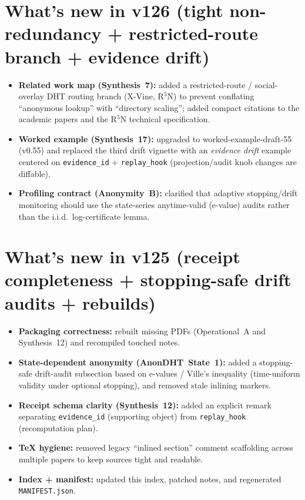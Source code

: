 \documentclass[11pt]{article}
\begin{document}
\section{What's new in v126 (tight non-redundancy + restricted-route branch + evidence drift)}
\begin{itemize}[leftmargin=*]
\item \textbf{Related work map (Synthesis~7):} added a restricted-route / social-overlay DHT routing branch (X-Vine, R$^{5}$N) to prevent conflating ``anonymous lookup'' with ``directory scaling''; added compact citations to the academic papers and the R$^{5}$N technical specification.
\item \textbf{Worked example (Synthesis~17):} upgraded to worked-example-draft-55 (v0.55) and replaced the third drift vignette with an \emph{evidence drift} example centered on \texttt{evidence\_id} + \texttt{replay\_hook} (projection/audit knob changes are diffable).
\item \textbf{Profiling contract (Anonymity~B):} clarified that adaptive stopping/drift monitoring should use the state-series anytime-valid (e-value) audits rather than the i.i.d.\ log-certificate lemma.
\end{itemize}

\section{What's new in v125 (receipt completeness + stopping-safe drift audits + rebuilds)}
\begin{itemize}[leftmargin=*]
\item \textbf{Packaging correctness:} rebuilt missing PDFs (Operational~A and Synthesis~12) and recompiled touched notes.
\item \textbf{State-dependent anonymity (AnonDHT~State~1):} added a stopping-safe drift-audit subsection based on e-values / Ville's inequality (time-uniform validity under optional stopping), and removed stale inlining markers.
\item \textbf{Receipt schema clarity (Synthesis~12):} added an explicit remark separating \texttt{evidence\_id} (supporting object) from \texttt{replay\_hook} (recomputation plan).
\item \textbf{TeX hygiene:} removed legacy ``inlined section'' comment scaffolding across multiple papers to keep sources tight and readable.
\item \textbf{Index + manifest:} updated this index, patched notes, and regenerated \texttt{MANIFEST.json}.
\end{itemize}
\end{document}
